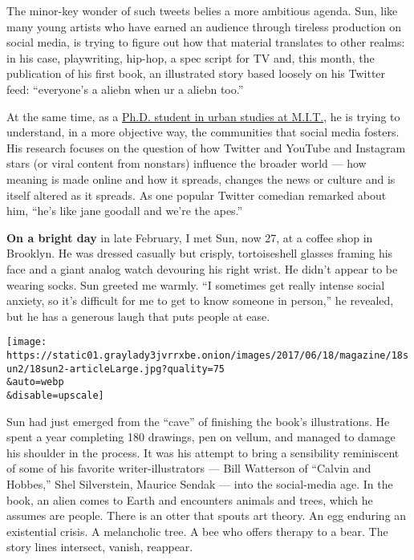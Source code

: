 \begin{quote}
\end{quote}

The minor-key wonder of such tweets belies a more ambitious agenda. Sun,
like many young artists who have earned an audience through tireless
production on social media, is trying to figure out how that material
translates to other realms: in his case, playwriting, hip-hop, a spec
script for TV and, this month, the publication of his first book, an
illustrated story based loosely on his Twitter feed: ``everyone's a
aliebn when ur a aliebn too.''

At the same time, as a \href{http://www.jonathan-sun.com/}{Ph.D. student
in urban studies at M.I.T.}, he is trying to understand, in a more
objective way, the communities that social media fosters. His research
focuses on the question of how Twitter and YouTube and Instagram stars
(or viral content from nonstars) influence the broader world --- how
meaning is made online and how it spreads, changes the news or culture
and is itself altered as it spreads. As one popular Twitter comedian
remarked about him, ``he's like jane goodall and we're the apes.''

\textbf{On a bright day} in late February, I met Sun, now 27, at a
coffee shop in Brooklyn. He was dressed casually but crisply,
tortoiseshell glasses framing his face and a giant analog watch
devouring his right wrist. He didn't appear to be wearing socks. Sun
greeted me warmly. ``I sometimes get really intense social anxiety, so
it's difficult for me to get to know someone in person,'' he revealed,
but he has a generous laugh that puts people at ease.

\texttt{[image: https://static01.graylady3jvrrxbe.onion/images/2017/06/18/magazine/18sun2/18sun2-articleLarge.jpg?quality=75\\\&auto=webp\\\&disable=upscale]}

Sun had just emerged from the ``cave'' of finishing the book's
illustrations. He spent a year completing 180 drawings, pen on vellum,
and managed to damage his shoulder in the process. It was his attempt to
bring a sensibility reminiscent of some of his favorite
writer-illustrators --- Bill Watterson of ``Calvin and Hobbes,'' Shel
Silverstein, Maurice Sendak --- into the social-media age. In the book,
an alien comes to Earth and encounters animals and trees, which he
assumes are people. There is an otter that spouts art theory. An egg
enduring an existential crisis. A melancholic tree. A bee who offers
therapy to a bear. The story lines intersect, vanish, reappear.


